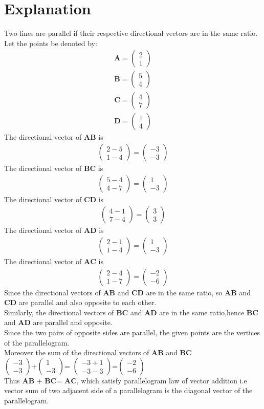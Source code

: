 \documentclass[journal,12pt,twocolumn]{IEEEtran}
\newcommand{\myvec}[1]{\ensuremath{\begin{pmatrix}#1\end{pmatrix}}}
\numberwithin{equation}{subsection}
\let\vec\mathbf
\begin{document}
\section{Explanation}
Two lines are parallel if their respective directional vectors are in the same ratio.\\
Let the points be denoted by:
 \begin{align}
     \vec{A}= \myvec{2 \\1}\\
     \vec{B}= \myvec{5 \\4}\\
     \vec{C}=\myvec{4 \\7}\\
      \vec{D}=\myvec{1 \\4 }
 \end{align}
 The directional vector of $\vec{AB}$ is
\begin{align}
\myvec{2-5\\1-4}=\myvec{-3 \\-3}
\end{align}
The directional vector of $\vec{BC}$ is
\begin{align}
\myvec{5-4\\4-7}=\myvec{1 \\-3}
\end{align}
The directional vector of $\vec{CD}$ is
\begin{align}
\myvec{4-1\\7-4}=\myvec{3 \\3}
\end{align}
The directional vector of $\vec{AD}$ is
\begin{align}
\myvec{2-1\\1-4}=\myvec{1 \\-3}
\end{align}
The directional vector of $\vec{AC}$ is
\begin{align}
\myvec{2-4\\1-7}=\myvec{-2 \\-6}
\end{align}
Since the directional vectors of $\vec{AB}$ and $\vec{CD}$ are in the same ratio, so $\vec{AB}$ and $\vec{CD}$ are parallel and also opposite to each other.\\
Similarly, the directional vectors of $\vec{BC}$ and $\vec{AD}$ are in the same ratio,hence $\vec{BC}$ and $\vec{AD}$ are parallel and opposite.\\ 
Since the two pairs of opposite sides are parallel, the given points are the vertices of the parallelogram.\\

Moreover the sum of the directional vectors of $\vec{AB}$ and $\vec{BC}$ \\
  
\myvec{-3\\-3}+\myvec{1 \\-3}= \myvec{-3+1 \\-3-3}=\myvec{-2 \\-6}\\

Thus $\vec{AB}$ $+$ $\vec{BC}$= $\vec{AC}$, which satisfy
parallelogram law of vector addition i.e vector
sum of two adjacent side of a parallelogram is the
diagonal vector of the parallelogram.
\end{document}
